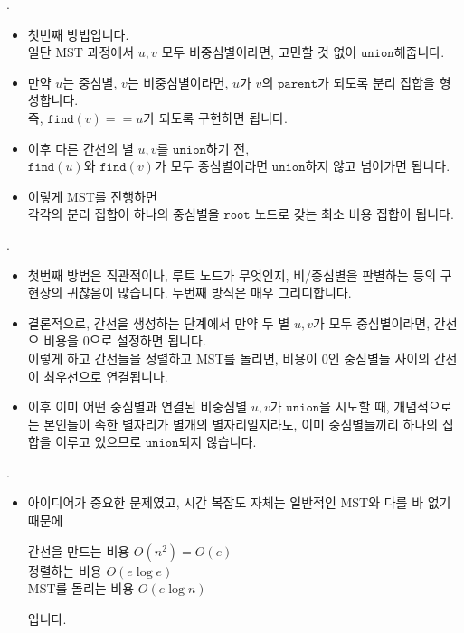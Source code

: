 \begin{frame}{\textbf{\pletter}. \ptitle}
    \begin{itemize}
        \item 첫번째 방법입니다.\\
        일단 MST 과정에서 $u, v$ 모두 비중심별이라면, 고민할 것 없이 $\texttt{union}$해줍니다.
        \item 만약 $u$는 중심별, $v$는 비중심별이라면, $u$가 $v$의 $\texttt{parent}$가 되도록 분리 집합을 형성합니다.\\
        즉, $\texttt{find}(v)==u$가 되도록 구현하면 됩니다.
        \item 이후 다른 간선의 별 $u, v$를 $\texttt{union}$하기 전,\\
        $\texttt{find}(u)$와 $\texttt{find}(v)$가 모두 중심별이라면 $\texttt{union}$하지 않고 넘어가면 됩니다.
        \item 이렇게 MST를 진행하면\\
        각각의 분리 집합이 하나의 중심별을 $\texttt{root}$ 노드로 갖는 최소 비용 집합이 됩니다.
    \end{itemize}
\end{frame}
\begin{frame}{\textbf{\pletter}. \ptitle}
    \begin{itemize}
        \item 첫번째 방법은 직관적이나, 루트 노드가 무엇인지, 비/중심별을 판별하는 등의 구현상의 귀찮음이 많습니다.
        두번째 방식은 매우 그리디합니다.
        \item 결론적으로, 간선을 생성하는 단계에서 만약 두 별 $u, v$가 모두 중심별이라면, 간선으 비용을 0으로 설정하면 됩니다.\\
        이렇게 하고 간선들을 정렬하고 MST를 돌리면,
        비용이 0인 중심별들 사이의 간선이 최우선으로 연결됩니다.
        \item 이후 이미 어떤 중심별과 연결된 비중심별 $u,v$가 $\texttt{union}$을 시도할 때,
        개념적으로는 본인들이 속한 별자리가 별개의 별자리일지라도, 이미 중심별들끼리 하나의 집합을 이루고 있으므로 $\texttt{union}$되지 않습니다.
    \end{itemize}
\end{frame}
\begin{frame}{\textbf{\pletter}. \ptitle}
    \begin{itemize}
        \item 아이디어가 중요한 문제였고, 시간 복잡도 자체는 일반적인 MST와 다를 바 없기 때문에\\

        \bigskip

        간선을 만드는 비용 $O(n^2)=O(e)$\\
        정렬하는 비용 $O(e \log e)$\\
        MST를 돌리는 비용 $O(e \log n)$

        \bigskip

        입니다.
    \end{itemize}
\end{frame}
